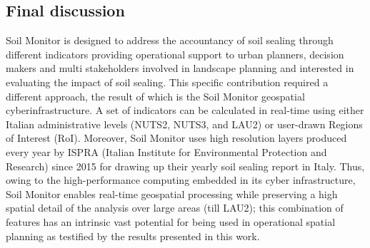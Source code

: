 \documentclass[APA,LATO1COL,doublespace]{WileyNJD-v2}
\newcommand{\toberevised}[1]{\emph{\textcolor{red}{#1}}} %
\newcommand{\update}[1]{\emph{\textcolor{blue}{#1}}}     %
\begin{document}
\subsection{Final discussion}
Soil Monitor is designed to address the accountancy of soil sealing through different indicators providing operational support to urban planners, decision makers and multi stakeholders involved in landscape planning and interested in evaluating the impact of soil sealing. 
This specific contribution required a different approach, the result of which is the Soil Monitor geospatial cyberinfrastructure. 
A set of indicators can be calculated in real-time using either Italian administrative levels (NUTS2, NUTS3, and LAU2) or user-drawn Regions of Interest (RoI). 
Moreover, Soil Monitor uses high resolution layers produced every year by ISPRA (Italian Institute for Environmental Protection and Research) since 2015 for drawing up their yearly soil sealing report in Italy. 
Thus, owing to the high-performance computing embedded in its cyber infrastructure, Soil Monitor enables real-time geospatial processing while preserving a high spatial detail of the analysis over large areas (till LAU2); this combination of features has an intrinsic vast potential for being used in operational spatial planning as testified by the results presented in this work. 
\end{document}
